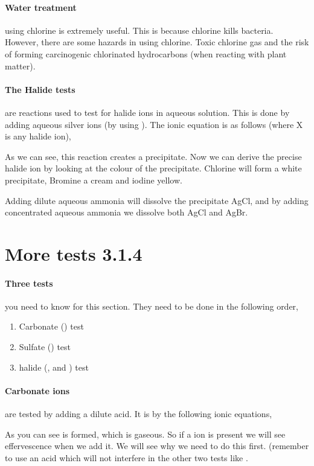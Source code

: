 	\paragraph{Water treatment} using chlorine is extremely useful. This is because chlorine kills bacteria. However, there are some hazards in using chlorine. Toxic chlorine gas and the risk of forming carcinogenic chlorinated hydrocarbons (when reacting with plant matter).
	
	\paragraph{The Halide tests} are reactions used to test for halide ions in aqueous solution. This is done by adding aqueous silver ions (by using ). The ionic equation is as follows (where X is any halide ion),
	
	\begin{center}
	\end{center}
	
	As we can see, this reaction creates a precipitate. Now we can derive the precise halide ion by looking at the colour of the precipitate. Chlorine will form a white precipitate, Bromine a cream and iodine yellow.
	
	Adding dilute aqueous ammonia will dissolve the precipitate AgCl, and by adding concentrated aqueous ammonia we dissolve both AgCl and AgBr.
	
\section{More tests 3.1.4}

	\paragraph{Three tests} you need to know for this section. They need to be done in the following order,
	\begin{enumerate}
		\item Carbonate () test
		\item Sulfate () test
		\item halide (, and ) test
	\end{enumerate}
	
	\paragraph{Carbonate ions} are tested by adding a dilute acid. It is by the following ionic equations,
	\begin{center}
	\end{center}
	As you can see  is formed, which is gaseous. So if a  ion is present we will see effervescence when we add it. We will see why we need to do this first. (remember to use an acid which will not interfere in the other two tests like .
	
